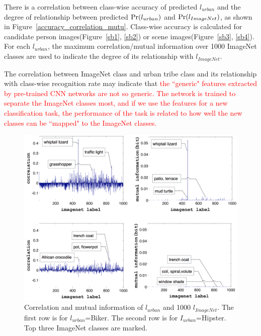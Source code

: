 \documentclass[10pt,twocolumn,letterpaper]{article}
\begin{document}
There is a correlation between class-wise accuracy of predicted $l_{urban}$ and the degree of relationship between predicted $\textup{Pr}(l_{urban})$ and $\textup{Pr}(l_{ImageNet})$, as shown in Figure~\ref{accuracy_correlation_mutu}. Class-wise accuracy is calculated for candidate person images(Figure~\ref{sb1}, \ref{sb2}) or scene images(Figure~\ref{sb3}, \ref{sb4}). For each $l_{urban}$, the maximum correlation/mutual information over 1000 ImageNet classes are used to indicate the degree of its relationship with $l_{ImageNet}$.

The correlation between ImageNet class and urban tribe class and its relationship with class-wise recognition rate may indicate that \textcolor{red} {the ``generic" features extracted by pre-trained CNN networks are not so generic. The network is trained to separate the ImageNet classes most, and if we use the features for a new classification task, the performance of the task is related to how well the new classes can be ``mapped" to the ImageNet classes. }



\begin{figure}[!t]
\begin{center}
\includegraphics[width=1\linewidth]{correlation}
\end{center}
\caption{Correlation and mutual information of $l_{urban}$ and 1000 $l_{ImageNet}$. The first row is for $l_{urban}$=Biker. The second row is for $I_{urban}$=Hipster. Top three ImageNet classes are marked. }
\label{correlation_muti}
\end{figure}
\end{document}
